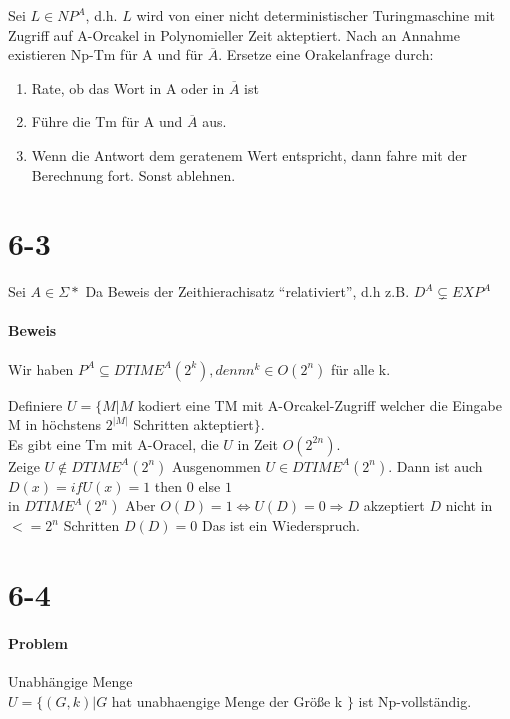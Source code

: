 \documentclass[12pt, oneside, a4paper, numbers=enddot, abstracton, parskip=full]{scrreprt}
\begin{document}
Sei $L\in NP^A$, d.h. $L$ wird von einer nicht deterministischer
Turingmaschine mit Zugriff auf A-Orcakel in Polynomieller Zeit akteptiert.
Nach an Annahme existieren Np-Tm für A und für $\overline{A}$. Ersetze eine Orakelanfrage durch:
\begin{enumerate}
\item Rate, ob das Wort in A oder in $\overline{A}$ ist
\item Führe die Tm für A und $\overline{A}$ aus.
\item Wenn die Antwort dem geratenem Wert entspricht, dann fahre mit
  der Berechnung fort. Sonst ablehnen.
\end{enumerate}

\section{6-3}
Sei $A \in \Sigma*$ Da Beweis der Zeithierachisatz  ``relativiert'',
d.h z.B. $D^A \subsetneq EXP^A$

\paragraph{Beweis}
Wir haben $P^A \subseteq DTIME^A(2^k), denn n^k \in O(2^n)$ für alle k.

Definiere $U=\{M | M$ kodiert eine TM mit A-Orcakel-Zugriff welcher
die Eingabe M in höchstens $2^{|M|}$ Schritten akteptiert$\}$.\\

Es gibt eine Tm mit A-Oracel, die $U$ in Zeit $O(2^{2n})$.  \\

Zeige $U \notin DTIME^A(2^n)$ Ausgenommen $U \in DTIME^A(2^n)$.
Dann ist auch $D(x) = if U(x) = 1$ then $0$ else $1$ \\

in $DTIME^A(2^n)$ Aber $O(D) = 1 \Leftrightarrow  U(D) = 0 \Rightarrow D$ akzeptiert $ D$ nicht  in
$ <= 2^n $ Schritten $D(D) = 0 $ Das ist ein Wiederspruch.

\section{6-4}
\paragraph{Problem} Unabhängige Menge \\

$U=\{(G,k) | G$ hat unabhaengige Menge der Größe k $\}$ ist Np-vollständig.
\end{document}
